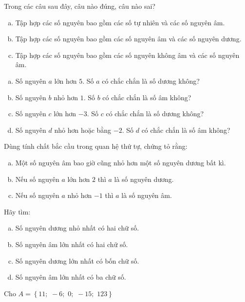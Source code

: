 \begin{bt}
\end{bt}   \begin{bt}
Trong các câu sau đây, câu nào đúng, câu nào sai?
\begin{enumerate}[a)]
\item Tập hợp các số nguyên bao gồm các số tự nhiên và các số nguyên âm.
\item Tập hợp các số nguyên bao gồm các số nguyên âm và các số nguyên dương.
\item Tập hợp các số nguyên bao gồm các số nguyên không âm và các số nguyên âm.
\end{enumerate}
\end{bt}   \begin{bt} \qquad
\begin{enumerate}[a)]
\item Số nguyên $a$ lớn hơn $5$. Số $a$ có chắc chắn là số dương không?
\item Số nguyên $b$ nhỏ hơn $1$. Số $b$ có chắc chắn là số âm không?
\item Số nguyên $c$ lớn hơn $-3$. Số  $c$ có chắc chắn là số dương không?
\item Số nguyên $d$ nhỏ hơn hoặc bằng $-2$. Số $d$ có chắc chắn là số âm không?
\end{enumerate}
\end{bt}   \begin{bt}
Dùng tính chất bắc cầu trong quan hệ thứ tự, chứng tỏ rằng:
\begin{enumerate}[a)]
\item Một số nguyên âm bao giờ cũng nhỏ hơn một số nguyên dương bất kì.
\item Nếu số nguyên $a$ lớn hơn $2$ thì $a$ là số nguyên dương.
\item Nếu số nguyên $a$ nhỏ hơn $-1$ thì $a$ là số nguyên âm.
\end{enumerate}
\end{bt}   \begin{bt}
Hãy tìm:
\begin{enumerate}[a)]
\item Số nguyên dương nhỏ nhất có hai chữ số.
\item Số nguyên âm lớn nhất có hai chữ số.
\item Số nguyên dương lớn nhất có bốn chữ số.
\item Số nguyên âm lớn nhất có ba chữ số.
\end{enumerate}
\end{bt}   \begin{bt}
Cho $A = \left\{ {11;\,\, - 6;\,\,0;\,\, - 15;\,\,123} \right\}$

\end{bt}
